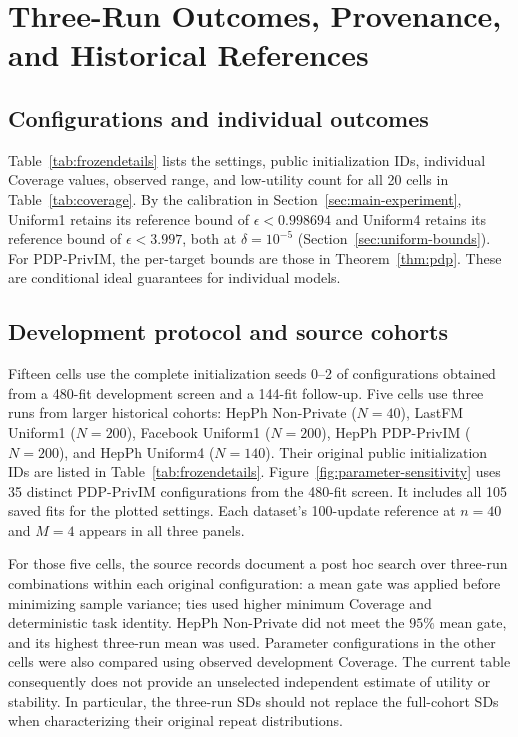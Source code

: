 \chapter{Three-Run Outcomes, Provenance, and Historical References}\label{app:development}
\section{Configurations and individual outcomes}
Table~\ref{tab:frozendetails} lists the settings, public initialization IDs, individual Coverage values, observed range, and low-utility count for all 20 cells in Table~\ref{tab:coverage}. By the calibration in Section~\ref{sec:main-experiment}, Uniform1 retains its reference bound of $\epsilon<0.998694$ and Uniform4 retains its reference bound of $\epsilon<3.997$, both at $\delta=10^{-5}$ (Section~\ref{sec:uniform-bounds}). For PDP-PrivIM, the per-target bounds are those in Theorem~\ref{thm:pdp}. These are conditional ideal guarantees for individual models.
{\setlength{\tabcolsep}{4pt}

}
\clearpage
\section{Development protocol and source cohorts}\label{sec:sourceprotocol}
Fifteen cells use the complete initialization seeds 0--2 of configurations obtained from a 480-fit development screen and a 144-fit follow-up. Five cells use three runs from larger historical cohorts: HepPh Non-Private ($N=40$), LastFM Uniform1 ($N=200$), Facebook Uniform1 ($N=200$), HepPh PDP-PrivIM ($N=200$), and HepPh Uniform4 ($N=140$). Their original public initialization IDs are listed in Table~\ref{tab:frozendetails}. Figure~\ref{fig:parameter-sensitivity} uses 35 distinct PDP-PrivIM configurations from the 480-fit screen. It includes all 105 saved fits for the plotted settings. Each dataset's 100-update reference at $n=40$ and $M=4$ appears in all three panels.

For those five cells, the source records document a post hoc search over three-run combinations within each original configuration: a mean gate was applied before minimizing sample variance; ties used higher minimum Coverage and deterministic task identity. HepPh Non-Private did not meet the $95\%$ mean gate, and its highest three-run mean was used. Parameter configurations in the other cells were also compared using observed development Coverage. The current table consequently does not provide an unselected independent estimate of utility or stability. In particular, the three-run SDs should not replace the full-cohort SDs when characterizing their original repeat distributions.

